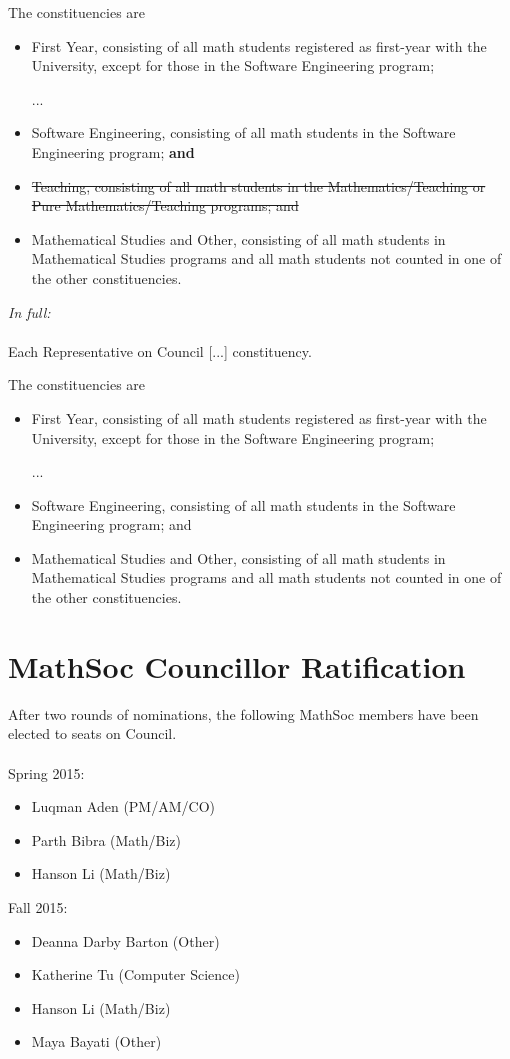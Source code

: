 \documentclass[12pt, letterpaper]{article}
\begin{document}
The constituencies are
\begin{itemize}
	\item First Year, consisting of all math students registered as first-year
	with the University, except for those in the Software Engineering program;
	\item [...]
	\item Software Engineering, consisting of all math students in the Software
	Engineering program; \textbf{and}
	\item \sout{Teaching, consisting of all math students in the
	Mathematics/Teaching or Pure Mathematics/Teaching programs;
	and}
	\item Mathematical Studies and Other, consisting of all math students in
	Mathematical Studies programs and all math students not counted in one of
	the other constituencies.
\end{itemize}
\emph{In full:}\\\\
Each Representative on Council [...] constituency.

The constituencies are
\begin{itemize}
	\item First Year, consisting of all math students registered as first-year
	with the University, except for those in the Software Engineering program;
	\item [...]
	\item Software Engineering, consisting of all math students in the Software
	Engineering program; and
	\item Mathematical Studies and Other, consisting of all math students in
	Mathematical Studies programs and all math students not counted in one of
	the other constituencies.
\end{itemize}


\newpage
{}


\newpage
{}
\section*{MathSoc Councillor Ratification}
After two rounds of nominations, the following MathSoc members have been elected to seats on Council.\\\\
Spring 2015:
\begin{itemize}
	\item Luqman Aden (PM/AM/CO)
	\item Parth Bibra (Math/Biz)
	\item Hanson Li (Math/Biz)
\end{itemize}
Fall 2015:
\begin{itemize}
	\item Deanna Darby Barton (Other)
	\item Katherine Tu (Computer Science)
	\item Hanson Li (Math/Biz)
	\item Maya Bayati (Other)
\end{itemize}
\end{document}
